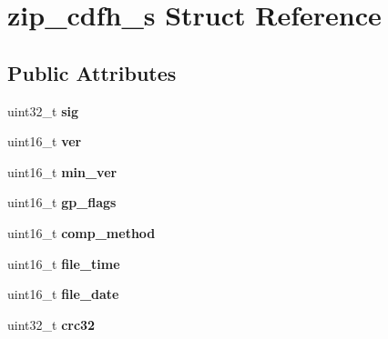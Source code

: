 \hypertarget{structzip__cdfh__s}{}\section{zip\+\_\+cdfh\+\_\+s Struct Reference}
\label{structzip__cdfh__s}
\subsection*{Public Attributes}
\begin{DoxyCompactItemize}
\item 
uint32\+\_\+t {\bfseries sig}\hypertarget{structzip__cdfh__s_a85251d622d33c603beb77e34b05591d3}{}\label{structzip__cdfh__s_a85251d622d33c603beb77e34b05591d3}

\item 
uint16\+\_\+t {\bfseries ver}\hypertarget{structzip__cdfh__s_a98fc46d8215c3e897c57abe9fb204ae0}{}\label{structzip__cdfh__s_a98fc46d8215c3e897c57abe9fb204ae0}

\item 
uint16\+\_\+t {\bfseries min\+\_\+ver}\hypertarget{structzip__cdfh__s_ae5717a79ca53ffc6ff32a671b1711dc7}{}\label{structzip__cdfh__s_ae5717a79ca53ffc6ff32a671b1711dc7}

\item 
uint16\+\_\+t {\bfseries gp\+\_\+flags}\hypertarget{structzip__cdfh__s_a36ca97aaf90059e474743b2843c5cecc}{}\label{structzip__cdfh__s_a36ca97aaf90059e474743b2843c5cecc}

\item 
uint16\+\_\+t {\bfseries comp\+\_\+method}\hypertarget{structzip__cdfh__s_a22e82aaf007cceadddf02998c6090197}{}\label{structzip__cdfh__s_a22e82aaf007cceadddf02998c6090197}

\item 
uint16\+\_\+t {\bfseries file\+\_\+time}\hypertarget{structzip__cdfh__s_a01ef2fd792678bb549e50834cd05b750}{}\label{structzip__cdfh__s_a01ef2fd792678bb549e50834cd05b750}

\item 
uint16\+\_\+t {\bfseries file\+\_\+date}\hypertarget{structzip__cdfh__s_a8119698d59b7aa4a0accfaaae679aa66}{}\label{structzip__cdfh__s_a8119698d59b7aa4a0accfaaae679aa66}

\item 
uint32\+\_\+t {\bfseries crc32}\hypertarget{structzip__cdfh__s_a46f6ecd5f2fb0dd796193891e2b67dda}{}\label{structzip__cdfh__s_a46f6ecd5f2fb0dd796193891e2b67dda}


\end{DoxyCompactItemize}
